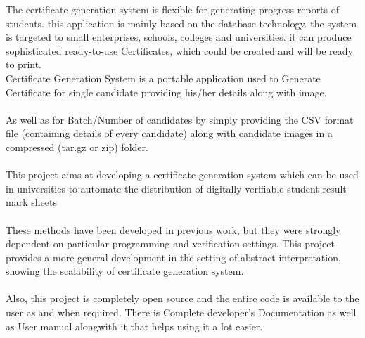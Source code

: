 The certificate generation system is flexible for generating progress reports of students. this application is mainly based on the database technology. the system is targeted to small enterprises, schools, colleges and universities. it can produce sophisticated ready-to-use Certificates, which could be created and will be ready to print.\\

Certificate Generation System is a portable application used to Generate Certificate for single candidate providing his/her details along with image.\\\\
As well as for Batch/Number of candidates by simply providing the CSV format file (containing details of every candidate) along with candidate images in a compressed (tar.gz or zip) folder.
\\\\
This project aims at developing a certificate generation system which can be used in universities to automate the distribution of digitally verifiable student result mark sheets\\\\
These methods have been developed in previous
work, but they were strongly dependent on particular programming and verification settings. This project
provides a more general development in the setting of abstract interpretation, showing the scalability of
certificate generation system.\\\\
Also,  this project is completely open source and the entire code is available to the user as and
when required.  There is Complete developer's Documentation as well as User manual alongwith
it that helps using it a lot easier.

